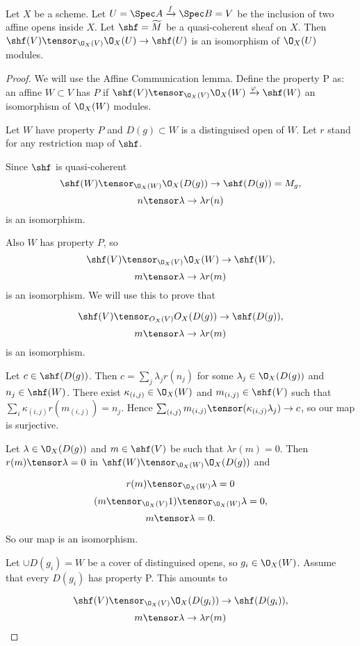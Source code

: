 \begin{question}
Let $X$ be a scheme.
Let $U=\Spec A \xrightarrow{f} \Spec B = V$ be the inclusion of two affine opens inside $X$.
Let $\shf=\widetilde{M}$ be a quasi-coherent sheaf on $X$. 
Then $\shf(V)\tensor_{\O_X(V)} \O_X(U) \rightarrow \shf(U)$ is an isomorphism of $\O_X(U)$ modules.
\end{question}

\begin{proof}
We will use the Affine Communication lemma.%
Define the property P as:
an affine $W\subset V$ has $P$ if $\shf(V)\tensor_{\O_X(V)} \O_X(W) \xrightarrow{\varphi} \shf(W)$ an isomorphism of $\O_X(W)$ modules.

Let $W$ have property $P$ and $D(g)\subset W$ is a distinguised open of $W$.
Let $r$ stand for any restriction map of $\shf$.

Since $\shf$ is quasi-coherent
\[\shf(W)\tensor_{\O_X(W)} \O_X(D(g)) \rightarrow \shf(D(g))= M_g,\]
\[ n \tensor \lambda \to \lambda r(n)\]
is an isomorphism.

Also $W$ has property $P$, so 
\[\shf(V)\tensor_{\O_X(V)} \O_X(W) \rightarrow \shf(W),\]
\[ m \tensor \lambda \to \lambda r(m)\]
is an isomorphism.
We will use this to prove that 

\[\shf(V)\tensor_{O_X(V)} O_X(D(g)) \rightarrow \shf(D(g)),\]
\[m \tensor \lambda \to \lambda r(m)\]
is an isomorphism.

Let $c \in \shf(D(g))$. 
Then $c= \sum_j \lambda_j r(n_j)$ for some $\lambda_j\in \O_X(D(g))$ and $n_j\in\shf(W)$.
There exist $\kappa_{(i,j)} \in \O_X(W)$ and $m_{(i,j)}\in \shf(V)$ such that $\sum_i \kappa_{(i,j)} r(m_{(i,j)})= n_j$.
Hence $\sum_{(i,j)} m_{(i,j)} \tensor (\kappa_{(i,j)}\lambda_j)\to c$, so our map is surjective.

Let $\lambda\in \O_X(D(g))$ and $m\in \shf(V)$ be such that $\lambda r(m)=0$.
Then $r(m) \tensor \lambda = 0$ in $\shf(W)\tensor_{\O_X(W)} \O_X(D(g))$ and

\[ r(m) \tensor_{\O_X(W)} \lambda = 0\]
\[(m\tensor_{\O_X(V)} 1) \tensor_{\O_X(W)} \lambda = 0,\]
\[ m\tensor \lambda = 0 .\]

So our map is an isomorphism.

Let $\cup D(g_i) = W$ be a cover of distinguised opens, so $g_i\in \O_X(W)$.
Assume that every $D(g_i)$ has property P.
This amounts to

\[\shf(V)\tensor_{\O_X(V)} \O_X(D(g_i)) \rightarrow \shf(D(g_i)),\]
\[m \tensor \lambda \to \lambda r(m)\]


\end{proof}
